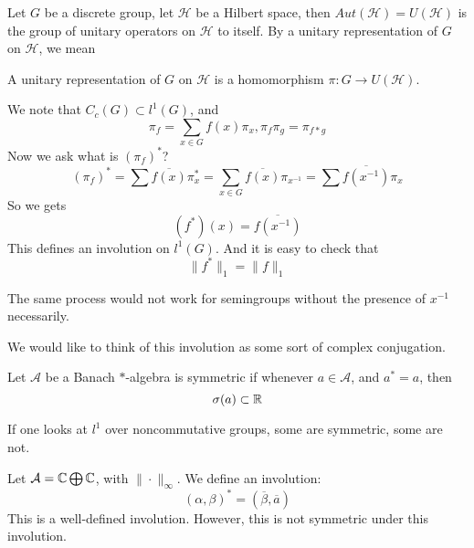 Let $G$ be a discrete group, let $\mathcal{H}$ be a Hilbert space, then $Aut(\mathcal{H})=U(\mathcal{H})$ is the group of unitary operators on $\mathcal{H}$ to itself. By a unitary representation of $G$ on $\mathcal{H}$, we mean 
\begin{definition}
    A unitary representation of $G$ on $\mathcal{H}$ is a homomorphism $\pi: G\to U(\mathcal{H})$.
\end{definition}
We note that $C_c(G)\subset l^1(G)$, and
\begin{equation*}
    \pi_f=\sum_{x\in G}f(x)\pi_x, \pi_f\pi_g=\pi_{f\ast g}
\end{equation*}
Now we ask what is $(\pi_f)^*$?
\begin{equation*}
    (\pi_f)^*=\sum \overline{f(x)}\pi_x^*=\sum_{x\in G}\overline{f(x)}\pi_{x^{-1}}=\sum\overline{f(x^{-1})}\pi_x
\end{equation*}
So we gets
\begin{equation*}
    (f^*)(x)=\overline{f(x^{-1})}
\end{equation*}
This defines an involution on $l^1(G)$. And it is easy to check that 
\begin{equation*}
    \|f^*\|_{1}=\|f\|_1
\end{equation*}
\begin{remark}
    The same process would not work for semingroups without the presence of $x^{-1}$ necessarily.
\end{remark}

We would like to think of this involution as some sort of complex conjugation.

\begin{definition}
    Let $\mathcal{A}$ be a Banach $*$-algebra is symmetric if whenever $a\in\mathcal{A}$, and $a^*=a$, then
    \begin{equation*}
        \sigma(a)\subset\mathbb{R}
    \end{equation*}
\end{definition}
If one looks at $l^1$ over noncommutative groups, some are symmetric, some are not.

\begin{example}
    Let $\mathcal{A}=\mathbb{C}\bigoplus\mathbb{C}$, with $\|\cdot\|_\infty$. We define an involution:
    \begin{equation*}
        (\alpha, \beta)^*=(\overline{\beta}, \overline{a})
    \end{equation*}
    This is a well-defined involution. However, this is not symmetric under this involution.
\end{example}

